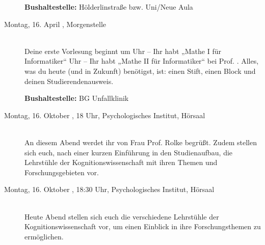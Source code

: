 \begin{description}
\textbf{Bushaltestelle:} Hölderlinstraße bzw. Uni/Neue Aula

\fi






\ifbachelor
\item[Montag, 16. April \Jahr, Morgenstelle]\ \\
Deine erste Vorlesung beginnt um 
 Uhr – Ihr habt „Mathe I für Informatiker“  \fi
{} Uhr – Ihr habt „Mathe II für Informatiker“  \fi
bei Prof. \Matheprof.
Alles, was du heute (und in Zukunft) benötigst, ist: einen Stift, einen Block und deinen Studierendenausweis.

\textbf{Bushaltestelle:} BG Unfallklinik   
\fi

\ifkogwiss
\ifbachelor 
 \item[Montag, 16. Oktober \Jahr, 18 Uhr, Psychologisches Institut, Hörsaal]\ \\
 An diesem Abend werdet ihr von Frau Prof. Rolke begrüßt. Zudem stellen sich euch, nach einer kurzen Einführung in den Studienaufbau, die Lehrstühle der Kognitionswissenschaft mit ihren Themen und Forschungsgebieten vor.
 \fi
 \ifmaster
 \item[Montag, 16. Oktober \Jahr, 18:30 Uhr, Psychologisches Institut, Hörsaal]\ \\
 Heute Abend stellen sich euch die verschiedene Lehrstühle der Kognitionswissenschaft vor, um einen Einblick in ihre Forschungsthemen zu ermöglichen.
 \fi
 

\end{description}
